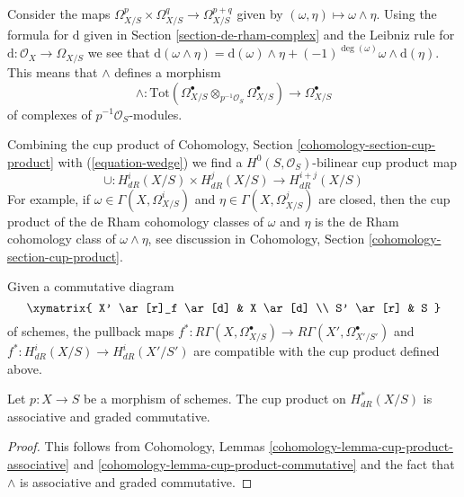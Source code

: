 \noindent
Consider the maps
$\Omega^p_{X/S} \times \Omega^q_{X/S} \to \Omega^{p + q}_{X/S}$
given by $(\omega , \eta) \longmapsto \omega \wedge \eta$.
Using the formula for $\text{d}$ given in Section \ref{section-de-rham-complex}
and the Leibniz rule for $\text{d} : \mathcal{O}_X \to \Omega_{X/S}$
we see that $\text{d}(\omega \wedge \eta) = \text{d}(\omega) \wedge \eta +
(-1)^{\deg(\omega)} \omega \wedge \text{d}(\eta)$. This means that
$\wedge$ defines a morphism
\begin{equation}
\label{equation-wedge}
\wedge :
\text{Tot}(
\Omega^\bullet_{X/S} \otimes_{p^{-1}\mathcal{O}_S} \Omega^\bullet_{X/S})
\longrightarrow
\Omega^\bullet_{X/S}
\end{equation}
of complexes of $p^{-1}\mathcal{O}_S$-modules.

\medskip\noindent
Combining the cup product of
Cohomology, Section \ref{cohomology-section-cup-product}
with (\ref{equation-wedge}) we find a
$H^0(S, \mathcal{O}_S)$-bilinear cup product map
$$
\cup : H^i_{dR}(X/S) \times H^j_{dR}(X/S) \longrightarrow H^{i + j}_{dR}(X/S)
$$
For example, if $\omega \in \Gamma(X, \Omega^i_{X/S})$ and
$\eta \in \Gamma(X, \Omega^j_{X/S})$ are closed, then
the cup product of the de Rham cohomology classes of
$\omega$ and $\eta$ is the de Rham cohomology class of $\omega \wedge \eta$,
see discussion in Cohomology, Section \ref{cohomology-section-cup-product}.

\medskip\noindent
Given a commutative diagram
$$
\xymatrix{
X' \ar[r]_f \ar[d] & X \ar[d] \\
S' \ar[r] & S
}
$$
of schemes, the pullback maps
$f^* : R\Gamma(X, \Omega^\bullet_{X/S}) \to R\Gamma(X', \Omega^\bullet_{X'/S'})$
and
$f^* : H^i_{dR}(X/S) \longrightarrow H^i_{dR}(X'/S')$
are compatible with the cup product defined above.

\begin{lemma}
\label{lemma-cup-product-graded-commutative}
Let $p : X \to S$ be a morphism of schemes.
The cup product on $H^*_{dR}(X/S)$ is associative and
graded commutative.
\end{lemma}

\begin{proof}
This follows from
Cohomology, Lemmas \ref{cohomology-lemma-cup-product-associative} and
\ref{cohomology-lemma-cup-product-commutative}
and the fact that $\wedge$ is associative and graded commutative.
\end{proof}





